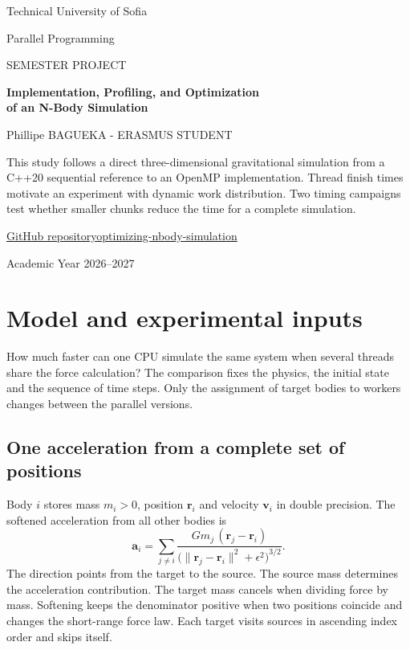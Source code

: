 \documentclass[11pt,a4paper]{article}
\newcommand{\repourl}{https://github.com/phillipe-BAGUEKA/optimizing-nbody-simulation}
\newcommand{\topic}[1]{\clearpage\section*{#1}}
\newcommand{\subtopic}[1]{\subsection*{#1}}
\begin{document}
\thispagestyle{empty}
\vspace*{17mm}
\begingroup\centering
{\large Technical University of Sofia\par}
{Parallel Programming\par}
\vspace{15mm}
{\small SEMESTER PROJECT\par}
\vspace{2.5mm}
{\bfseries\fontsize{19}{23}\selectfont
Implementation, Profiling, and Optimization\\
of an N-Body Simulation\par}
\vspace{3mm}
{\large Phillipe BAGUEKA - ERASMUS STUDENT\par}
\endgroup
\vspace{10mm}
\noindent
This study follows a direct three-dimensional gravitational simulation from a
C++20 sequential reference to an OpenMP implementation. Thread finish times
motivate an experiment with dynamic work distribution. Two timing campaigns
test whether smaller chunks reduce the time for a complete simulation.
\par\vspace{5mm}
{\centering\href{\repourl}{GitHub repository\enspace optimizing-nbody-simulation}\par}
\vfill
{\centering Academic Year 2026--2027\par}

\topic{Model and experimental inputs}
How much faster can one CPU simulate the same system when several threads
share the force calculation? The comparison fixes the physics, the initial
state and the sequence of time steps. Only the assignment of target bodies
to workers changes between the parallel versions.

\subtopic{One acceleration from a complete set of positions}
Body $i$ stores mass $m_i>0$, position $\mathbf r_i$ and velocity $\mathbf v_i$
in double precision. The softened acceleration from all other bodies is
\[
 \mathbf a_i=\sum_{j\ne i}\frac{Gm_j\,(\mathbf r_j-\mathbf r_i)}
 {\bigl(\|\mathbf r_j-\mathbf r_i\|^2+\epsilon^2\bigr)^{3/2}} .
\]
The direction points from the target to the source. The source mass determines
the acceleration contribution. The target mass cancels when dividing force by
mass. Softening keeps the denominator positive when two positions coincide
and changes the short-range force law. Each target visits sources in ascending
index order and skips itself.
\end{document}
